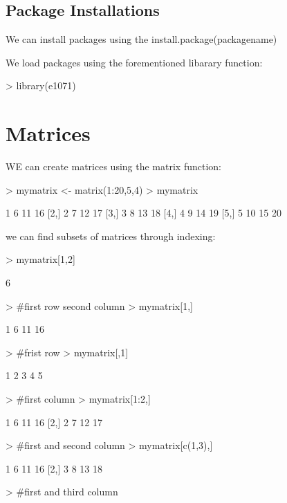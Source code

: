 \documentclass[twoside]{article}
\theoremstyle{definition}
\theoremstyle{definition}
\begin{document}
\subsection{Package Installations}
We can install packages using the install.package(packagename)

We load packages using the forementioned libarary function:
\begin{Schunk}
\begin{Sinput}
> library(e1071)
\end{Sinput}
\end{Schunk}
\section{Matrices}
WE can create matrices using the matrix function:
\begin{Schunk}
\begin{Sinput}
> mymatrix <- matrix(1:20,5,4)
> mymatrix
\end{Sinput}
\begin{Soutput}
     [,1] [,2] [,3] [,4]
[1,]    1    6   11   16
[2,]    2    7   12   17
[3,]    3    8   13   18
[4,]    4    9   14   19
[5,]    5   10   15   20
\end{Soutput}
\end{Schunk}
we can find subsets of matrices through indexing:
\begin{Schunk}
\begin{Sinput}
> mymatrix[1,2] 
\end{Sinput}
\begin{Soutput}
[1] 6
\end{Soutput}
\begin{Sinput}
> #first row second column
> mymatrix[1,]
\end{Sinput}
\begin{Soutput}
[1]  1  6 11 16
\end{Soutput}
\begin{Sinput}
> #frist row
> mymatrix[,1]
\end{Sinput}
\begin{Soutput}
[1] 1 2 3 4 5
\end{Soutput}
\begin{Sinput}
> #first column
> mymatrix[1:2,]
\end{Sinput}
\begin{Soutput}
     [,1] [,2] [,3] [,4]
[1,]    1    6   11   16
[2,]    2    7   12   17
\end{Soutput}
\begin{Sinput}
> #first and second column
> mymatrix[c(1,3),]
\end{Sinput}
\begin{Soutput}
     [,1] [,2] [,3] [,4]
[1,]    1    6   11   16
[2,]    3    8   13   18
\end{Soutput}
\begin{Sinput}
> #first and third column
\end{Sinput}
\end{Schunk}
\end{document}
